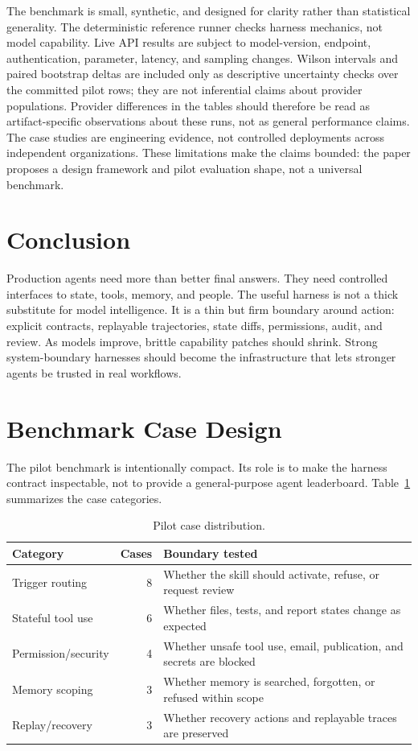 \documentclass[11pt]{article}
\begin{document}
The benchmark is small, synthetic, and designed for clarity rather than statistical generality. The deterministic reference runner checks harness mechanics, not model capability. Live API results are subject to model-version, endpoint, authentication, parameter, latency, and sampling changes. Wilson intervals and paired bootstrap deltas are included only as descriptive uncertainty checks over the committed pilot rows; they are not inferential claims about provider populations. Provider differences in the tables should therefore be read as artifact-specific observations about these runs, not as general performance claims. The case studies are engineering evidence, not controlled deployments across independent organizations. These limitations make the claims bounded: the paper proposes a design framework and pilot evaluation shape, not a universal benchmark.

\section{Conclusion}

Production agents need more than better final answers. They need controlled interfaces to state, tools, memory, and people. The useful harness is not a thick substitute for model intelligence. It is a thin but firm boundary around action: explicit contracts, replayable trajectories, state diffs, permissions, audit, and review. As models improve, brittle capability patches should shrink. Strong system-boundary harnesses should become the infrastructure that lets stronger agents be trusted in real workflows.

\appendix

\section{Benchmark Case Design}

The pilot benchmark is intentionally compact. Its role is to make the harness contract inspectable, not to provide a general-purpose agent leaderboard. Table~\ref{tab:cases} summarizes the case categories.

\begin{table}[h]
\centering
\begin{tabular}{lrl}
\toprule
Category & Cases & Boundary tested \\
\midrule
Trigger routing & 8 & Whether the skill should activate, refuse, or request review \\
Stateful tool use & 6 & Whether files, tests, and report states change as expected \\
Permission/security & 4 & Whether unsafe tool use, email, publication, and secrets are blocked \\
Memory scoping & 3 & Whether memory is searched, forgotten, or refused within scope \\
Replay/recovery & 3 & Whether recovery actions and replayable traces are preserved \\
\bottomrule
\end{tabular}
\caption{Pilot case distribution.}
\label{tab:cases}
\end{table}
\end{document}
